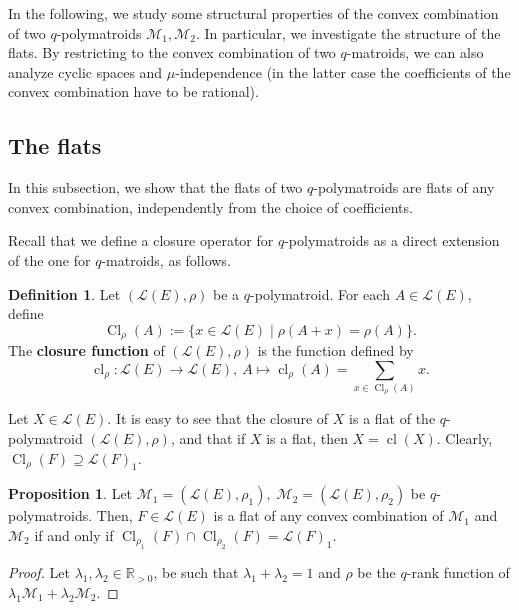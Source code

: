 \documentclass[a4paper,11pt,reqno]{amsart}
\theoremstyle{definition}
\newtheorem{definition}[theorem]{{{Definition}}}
\newtheorem{proposition}[theorem]{{{Proposition}}}
\newcommand{\mM}{\mathcal{M}}
\newcommand{\mL}{\mathcal{L}}
\newcommand{\R}{\mathbb R}
\DeclareMathOperator{\Cl}{Cl}
\DeclareMathOperator{\cl}{cl}
\begin{document}
{In the following, we study some structural properties of the convex combination of two $q$-polymatroids $\mM_1,\mM_2$.
In particular, we investigate the structure of the flats. By restricting to the convex combination of two $q$-matroids, we can also analyze cyclic spaces and $\mu$-independence (in the latter case the coefficients of the convex combination have to be rational).


\subsection{The flats}\label{subsec: flats}

In this subsection, we show that the flats of two $q$-polymatroids are flats of any convex combination, independently from the choice of coefficients.

Recall that we define a closure operator for $q$-polymatroids as a direct extension of the one for $q$-matroids, as follows.

    \begin{definition}\label{def-closure}
        Let $(\mL(E),\rho)$ be a $q$-polymatroid.
        For each $A \in \mL(E)$, define $$\Cl_\rho(A):=\{x \in \mL(E)\mid \rho(A+x)=\rho(A)\}.$$
    	The \textbf{closure function} of $(\mL(E),\rho)$ is the function defined by
    	\[\cl_\rho:\mathcal{L}(E) \to\mathcal{L}(E), \  A \mapsto \cl_\rho(A)=\sum_{x \in \Cl_\rho(A)} x.
    	\]
    \end{definition}
Let $X\in\mL(E)$. It is easy to see that the closure of $X$ is a flat of the $q$-polymatroid $(\mL(E),\rho)$, and that if $X$ is a flat, then $X = \cl(X)$. Clearly, $\Cl_\rho(F)\supseteq \mL(F)_1$.



\begin{proposition}\label{prop:flats_conv_comb}
Let $\mM_1=(\mL(E),\rho_1), \; \mM_2=(\mL(E),\rho_2)$ be $q$-polymatroids. 
Then, $F\in\mL(E)$ is a flat of any convex combination of $\mM_1$ and $\mM_2$  if and only if $\Cl_{\rho_1}(F)\cap\Cl_{\rho_2}(F)=\mL(F)_1$.
\end{proposition}
\begin{proof}
 Let $\lambda_1,\lambda_2\in\R_{>0}$, be such that $\lambda_1+\lambda_2=1$ and  $\rho$ be the $q$-rank function of $\lambda_1\mM_1+\lambda_2\mM_2$.
 

\end{proof}}
\end{document}
